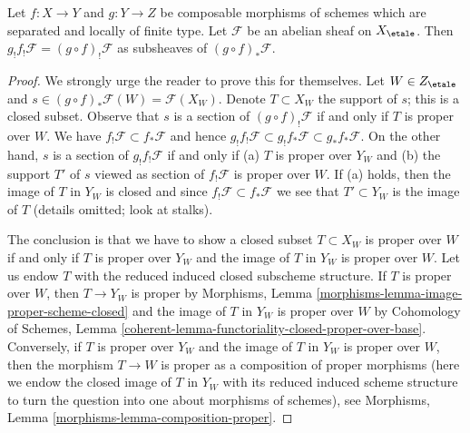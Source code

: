\begin{lemma}
\label{lemma-f-shriek-composition}
Let $f : X \to Y$ and $g : Y \to Z$ be composable morphisms of schemes which
are separated and locally of finite type. Let $\mathcal{F}$ be an abelian
sheaf on $X_\etale$. Then $g_!f_!\mathcal{F} = (g \circ f)_!\mathcal{F}$
as subsheaves of $(g \circ f)_*\mathcal{F}$.
\end{lemma}

\begin{proof}
We strongly urge the reader to prove this for themselves.
Let $W \in Z_\etale$ and
$s \in (g \circ f)_*\mathcal{F}(W) = \mathcal{F}(X_W)$.
Denote $T \subset X_W$ the support of $s$; this is a closed
subset. Observe that $s$ is a section of $(g \circ f)_!\mathcal{F}$
if and only if $T$ is proper over $W$. We have
$f_!\mathcal{F} \subset f_*\mathcal{F}$ and hence
$g_!f_!\mathcal{F} \subset g_!f_*\mathcal{F} \subset g_*f_*\mathcal{F}$.
On the other hand, $s$ is a section of $g_!f_!\mathcal{F}$ if and only
if (a) $T$ is proper over $Y_W$ and (b) the support $T'$ of $s$
viewed as section of $f_!\mathcal{F}$ is proper over $W$.
If (a) holds, then the image of $T$ in $Y_W$ is closed and since
$f_!\mathcal{F} \subset f_*\mathcal{F}$ we see that
$T' \subset Y_W$ is the image of $T$ (details omitted; look at stalks).

\medskip\noindent
The conclusion is that we have to show a closed subset $T \subset X_W$
is proper over $W$ if and only if $T$ is proper over $Y_W$
and the image of $T$ in $Y_W$ is proper over $W$. Let us endow $T$
with the reduced induced closed subscheme structure.
If $T$ is proper over $W$, then $T \to Y_W$ is proper by
Morphisms, Lemma \ref{morphisms-lemma-image-proper-scheme-closed}
and the image of $T$ in $Y_W$ is proper over $W$ by
Cohomology of Schemes, Lemma
\ref{coherent-lemma-functoriality-closed-proper-over-base}.
Conversely, if $T$ is proper over $Y_W$
and the image of $T$ in $Y_W$ is proper over $W$,
then the morphism $T \to W$ is proper as a composition
of proper morphisms (here we endow the closed image of $T$
in $Y_W$ with its reduced induced scheme structure to turn the
question into one about morphisms of schemes), see
Morphisms, Lemma \ref{morphisms-lemma-composition-proper}.
\end{proof}

